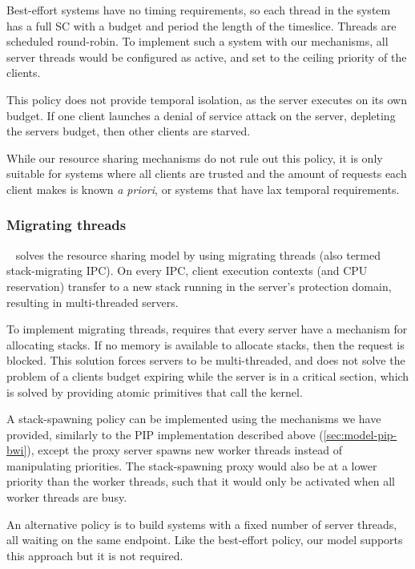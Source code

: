 Best-effort systems have no timing requirements, so each thread in the system has a full \gls{SC}
with a budget and period the length of the timeslice. Threads are scheduled round-robin. To
implement such a system with our mechanisms, all server threads would be configured as active, and 
set to the ceiling priority of the clients. 

This policy does not provide temporal isolation, as the server executes on its own budget.  If one
client launches a denial of service attack on the server, depleting the servers budget, then other
clients are starved. 

While our resource sharing mechanisms do not rule out this policy, it is only suitable for
systems where all clients are trusted and the amount of requests each client makes is known \emph{a
priori}, or systems that have lax temporal requirements.

\subsubsection{Migrating threads}

\composite~\citep{Parmer_10} solves the resource sharing model by using migrating 
threads (also termed stack-migrating IPC).
On every IPC, client execution contexts (and CPU reservation) transfer to a new stack running in the
server's protection domain, resulting in multi-threaded servers.

To implement migrating threads, \composite requires that every server have a mechanism for allocating stacks.
If no memory is available to allocate stacks, then the request is blocked.
This solution forces servers to be multi-threaded, and does not solve the problem of a clients budget expiring while the server is in a critical section, which is solved by providing atomic primitives that call the kernel.

A stack-spawning policy can be implemented using the mechanisms we have provided, similarly to
the \gls{PIP} implementation described above (\cref{sec:model-pip-bwi}), except the proxy
server spawns new worker threads instead of manipulating priorities. 
The stack-spawning proxy would also be at a lower priority than the worker threads, 
such that it would only be activated when all worker threads are busy.

An alternative policy is to build systems with a fixed number of server threads, all waiting on the
same endpoint. 
Like the best-effort policy, our model supports this approach but it is not required.


